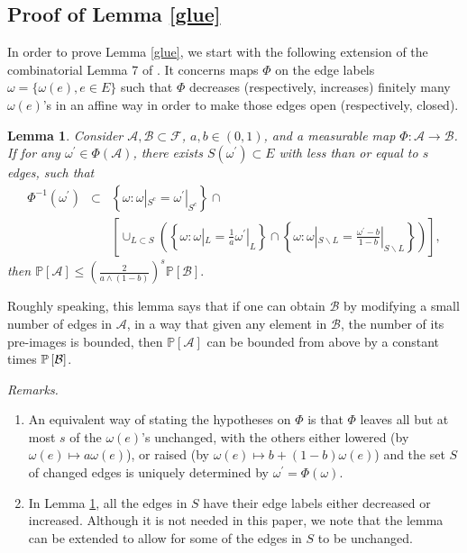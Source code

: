 \documentclass[12pt, twoside,a4paper,reqno]{amsart}
\theoremstyle{plain}
\newtheorem{lemma}[theorem]{Lemma}
\theoremstyle{remark}
\theoremstyle{definition}
\begin{document}
\subsection{Proof of Lemma \protect\ref{glue}\label{gluepf}}
In order to prove Lemma \ref{glue}, we start with the following extension of the combinatorial
Lemma 7 of \cite{DST}. It concerns maps $\Phi$ on the edge labels $\omega = \{\omega(e), e \in E \}$ such that
$\Phi$ decreases (respectively, increases) finitely many $\omega(e)$'s in an affine way in order to make those
edges open (respectively, closed).

\begin{lemma}
\label{combi}Consider $\mathcal{A},\mathcal{B}\subset \mathcal{F}$, $a,b \in (0,1)$, and a measurable map
$\Phi :\mathcal{A}\rightarrow \mathcal{B}$. If for any $\omega ^{\prime }\in
\Phi \left( \mathcal{A}\right) $, there exists $S\left( \omega ^{\prime
}\right) \subset E$ with less than or equal to $s$ edges, such that%
\begin{eqnarray*}
\Phi ^{-1}\left( \omega ^{\prime }\right)  &\subset &\left\{ \omega :\omega
|_{S^{c}}=\omega ^{\prime }|_{S^{c}}\right\} \cap  \\
&&\left[ \cup _{L\subset S}\left( \left\{ \omega :\omega |_{L}=\frac{1}{a}%
\omega ^{\prime }|_{L}\right\} \cap \left\{ \omega :\omega |_{S\backslash L}=%
\frac{\omega ^{\prime }-b}{1-b}|_{S\backslash L}\right\} \right) \right] ,
\end{eqnarray*}%
then $\mathbb{P}\left[ \mathcal{A}\right] \leq \left( \frac{2}{a\wedge
\left( 1-b\right) }\right) ^{s}\mathbb{P}\left[ \mathcal{B}\right] .$
\end{lemma}

Roughly speaking, this lemma says that if one can obtain $\mathcal{B}$ by modifying a small
number of edges in $\mathcal{A}$, in a way that given any element in $%
\mathcal{B}$, the number of its pre-images is bounded, then $\mathbb{P}\left[
\mathcal{A}\right] $ can be bounded from above by a constant times $\mathbb{P}\left[ \mathcal{%
B}\right] $.

\noindent\textit{Remarks.}
\begin{enumerate}[1.]
\item An equivalent way of stating the hypotheses on $\Phi$ is that $\Phi$ leaves all but at most $s$ of the
$\omega(e)$'s unchanged, with the others either lowered (by $\omega(e) \mapsto a\omega(e)$), or raised
(by  $\omega(e) \mapsto b+ (1-b)\omega(e)$) and the set $S$ of changed edges is uniquely determined by
$\omega^{\prime} = \Phi(\omega)$.
\item In Lemma \ref{combi}, all the edges in $S$ have their edge labels either decreased or increased. Although
it is not needed in this paper, we note that the lemma can be extended to allow for some of the edges in $S$ to be
unchanged.
\end{enumerate}
\end{document}
